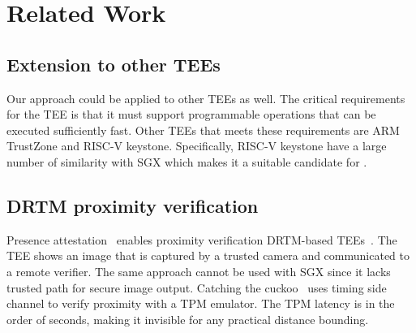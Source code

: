 \section{Related Work}
\label{sec:discussion_proximitee}

\subsection{Extension to other TEEs} 

Our approach could be applied to other TEEs as well. The critical requirements for the TEE is that it must support programmable operations that can be executed sufficiently fast. Other TEEs that meets these requirements are ARM TrustZone and RISC-V keystone. Specifically, RISC-V keystone have a large number of similarity with SGX which makes it a suitable candidate for \proximitee. %


\subsection{DRTM proximity verification}

Presence attestation~\cite{presenceAttestation} enables proximity verification DRTM-based TEEs~\cite{mccune2008flicker}. The TEE shows an image that is captured by a trusted camera and communicated to a remote verifier. The same approach cannot be used with SGX since it lacks trusted path for secure image output. Catching the cuckoo~\cite{CatchingCuckoo} uses timing side channel to verify proximity with a TPM emulator. The TPM latency is in the order of seconds, making it invisible for any practical distance bounding. 
